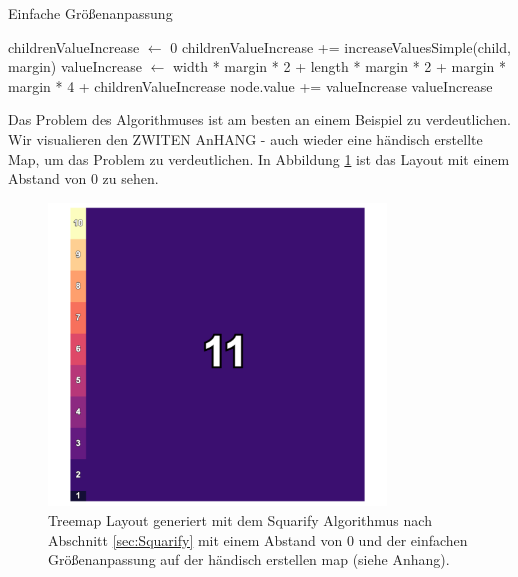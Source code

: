 \begin{algorithm}[H]
\caption{Einfache Größenanpassung}
\label{alg:EinfacheGrößenanpassung}
\begin{algorithmic}[1]
    \State childrenValueIncrease $\gets$ 0
            \State childrenValueIncrease += increaseValuesSimple(child, margin)
        \EndFor
    \EndIf
    \State valueIncrease $\gets$ width * margin * 2 + length * margin * 2 + margin * margin * 4 + childrenValueIncrease
    \State node.value += valueIncrease
    \State \Return valueIncrease
\EndFunction
\end{algorithmic}
\end{algorithm}

Das Problem des Algorithmuses ist am besten an einem Beispiel zu verdeutlichen. Wir visualieren den ZWITEN AnHANG - auch wieder eine händisch erstellte Map, um das Problem zu verdeutlichen. In Abbildung \ref{fig:zeroMarginSquarifyArtifialTwo} ist das Layout mit einem Abstand von 0 zu sehen. 

\begin{figure}
    \centering
    \includegraphics[width=0.8\textwidth]{images/zeroMarginSquarifyArtifialTwo.png}
    \caption{Treemap Layout generiert mit dem Squarify Algorithmus nach Abschnitt \ref{sec:Squarify} mit einem Abstand von 0 und der einfachen Größenanpassung auf der händisch erstellen map (siehe Anhang).}
    \label{fig:zeroMarginSquarifyArtifialTwo}
\end{figure}

